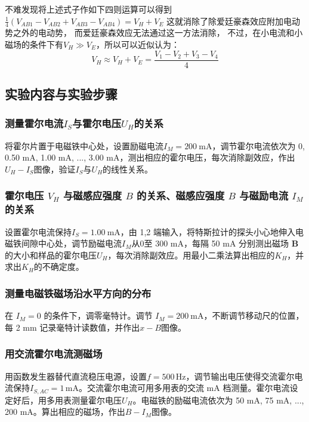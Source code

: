 \documentclass[11pt]{article}
\begin{document}
	不难发现将上述式子作如下四则运算可以得到$\frac{1}{4}(V_{AB1}-V_{AB2}+V_{AB3}-V_{AB4})=V_H+V_E$
	这就消除了除爱廷豪森效应附加电动势之外的电动势，
	而爱廷豪森效应无法通过这一方法消除，
	不过，在小电流和小磁场的条件下有$V_H\gg V_E$，所以可以近似认为：
	\begin{equation*}
		V_H\approx V_H+V_E=\frac{V_1-V_2+V_3-V_4}{4}
	\end{equation*}
	
	
	
	\subsection{实验内容与实验步骤}
	\subsubsection{测量霍尔电流$ I_S $与霍尔电压$ U_H $的关系}
	
	将霍尔片置于电磁铁中心处，设置励磁电流$ I_M= 200 \ \mathrm{mA}$，调节霍尔电流依次为 0, 0.50 mA, 1.00 mA, ..., 3.00 mA，测出相应的霍尔电压，每次消除副效应，作出$ U_H-I_S $图像，验证$ I_S $与$ U_H $的线性关系。
	
	\subsubsection{霍尔电压 $V_H$ 与磁感应强度 $B$ 的关系、磁感应强度 $B$ 与磁励电流 $I_M$ 的关系}
	
	设置霍尔电流保持$ I_S = 1.00 \ \mathrm{mA}$，由 1,2 端输入，将特斯拉计的探头小心地伸入电磁铁间隙中心处，调节励磁电流$ I_M $从$ 0 $至 300 mA，每隔 50 mA 分别测出磁场 $\boldsymbol{B}$ 的大小和样品的霍尔电压$ U_H $，每次消除副效应。用最小二乘法算出相应的$ K_H $，并求出$ K_H $的不确定度。
	
	\subsubsection{测量电磁铁磁场沿水平方向的分布}
	在 $I_M = 0$ 的条件下，调零毫特计。调节 $I_M = 200 \ \mathrm{mA}$，不断调节移动尺的位置，每 2 mm 记录毫特计读数值，并作出$ x-B $图像。
	
	\subsubsection{用交流霍尔电流测磁场}
	用函数发生器替代直流稳压电源，设置$ f=500\,\mathrm{Hz} $，调节输出电压使得交流霍尔电流保持$ I_{S, AC}= 1\,\mathrm{mA} $。交流霍尔电流可用多用表的交流 mA 档测量。霍尔电流设定好后，用多用表测量霍尔电压$ U_H $。电磁铁的励磁电流依次为 50 mA, 75 mA, ..., 200 mA。算出相应的磁场，作出$ B-I_M $图像。
	
\end{document}
